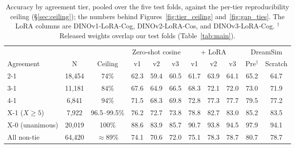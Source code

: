 \begin{table}[!ht]
\caption{Accuracy by agreement tier, pooled over the five test folds, against the per-tier reproducibility ceiling (\S\ref{sec:ceiling}); the numbers behind Figures~\ref{fig:tier_ceiling} and~\ref{fig:gap_ties}. The LoRA columns are DINOv1-LoRA-Cog, DINOv2-LoRA-Cos, and DINOv3-LoRA-Cog. $^\dagger$Released weights overlap our test folds (Table~\ref{tab:main}).}
\label{tab:tiergap}
\centering
\footnotesize
\setlength{\tabcolsep}{4pt}
\begin{tabular}{lcc ccc ccc cc}
\toprule
 & & & \multicolumn{3}{c}{Zero-shot cosine} & \multicolumn{3}{c}{+ LoRA} & \multicolumn{2}{c}{DreamSim} \\
\cmidrule(lr){4-6}\cmidrule(lr){7-9}\cmidrule(lr){10-11}
Agreement & N & Ceiling & v1 & v2 & v3 & v1 & v2 & v3 & Pre$^\dagger$ & Scratch \\
\midrule
2-1 & 18{,}454 & 74\% & 62.3 & 59.4 & 60.5 & 61.7 & 63.9 & 64.1 & 65.2 & 64.7 \\
3-1 & 11{,}181 & 84\% & 67.6 & 64.9 & 66.5 & 68.3 & 72.1 & 72.0 & 73.0 & 71.9 \\
4-1 & 6{,}841 & 94\% & 71.5 & 68.3 & 69.8 & 72.8 & 77.3 & 77.7 & 79.5 & 77.2 \\
X-1 ($X \geq 5$) & 7{,}922 & 96.5--99.5\% & 76.2 & 72.7 & 73.8 & 78.8 & 82.7 & 83.0 & 85.2 & 83.5 \\
X-0 (unanimous) & 20{,}019 & 100\% & 88.6 & 83.9 & 85.7 & 90.7 & 93.8 & 94.5 & 97.9 & 94.1 \\
\midrule
All non-tie & 64{,}420 & $\approx$89\% & 74.1 & 70.6 & 72.0 & 75.1 & 78.3 & 78.7 & 80.7 & 78.7 \\
\bottomrule
\end{tabular}
\end{table}


